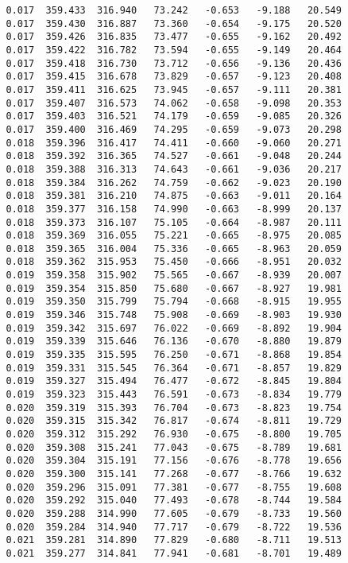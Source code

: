 \begin{verbatim}
   0.017  359.433  316.940   73.242   -0.653   -9.188   20.549
   0.017  359.430  316.887   73.360   -0.654   -9.175   20.520
   0.017  359.426  316.835   73.477   -0.655   -9.162   20.492
   0.017  359.422  316.782   73.594   -0.655   -9.149   20.464
   0.017  359.418  316.730   73.712   -0.656   -9.136   20.436
   0.017  359.415  316.678   73.829   -0.657   -9.123   20.408
   0.017  359.411  316.625   73.945   -0.657   -9.111   20.381
   0.017  359.407  316.573   74.062   -0.658   -9.098   20.353
   0.017  359.403  316.521   74.179   -0.659   -9.085   20.326
   0.017  359.400  316.469   74.295   -0.659   -9.073   20.298
   0.018  359.396  316.417   74.411   -0.660   -9.060   20.271
   0.018  359.392  316.365   74.527   -0.661   -9.048   20.244
   0.018  359.388  316.313   74.643   -0.661   -9.036   20.217
   0.018  359.384  316.262   74.759   -0.662   -9.023   20.190
   0.018  359.381  316.210   74.875   -0.663   -9.011   20.164
   0.018  359.377  316.158   74.990   -0.663   -8.999   20.137
   0.018  359.373  316.107   75.105   -0.664   -8.987   20.111
   0.018  359.369  316.055   75.221   -0.665   -8.975   20.085
   0.018  359.365  316.004   75.336   -0.665   -8.963   20.059
   0.018  359.362  315.953   75.450   -0.666   -8.951   20.032
   0.019  359.358  315.902   75.565   -0.667   -8.939   20.007
   0.019  359.354  315.850   75.680   -0.667   -8.927   19.981
   0.019  359.350  315.799   75.794   -0.668   -8.915   19.955
   0.019  359.346  315.748   75.908   -0.669   -8.903   19.930
   0.019  359.342  315.697   76.022   -0.669   -8.892   19.904
   0.019  359.339  315.646   76.136   -0.670   -8.880   19.879
   0.019  359.335  315.595   76.250   -0.671   -8.868   19.854
   0.019  359.331  315.545   76.364   -0.671   -8.857   19.829
   0.019  359.327  315.494   76.477   -0.672   -8.845   19.804
   0.019  359.323  315.443   76.591   -0.673   -8.834   19.779
   0.020  359.319  315.393   76.704   -0.673   -8.823   19.754
   0.020  359.315  315.342   76.817   -0.674   -8.811   19.729
   0.020  359.312  315.292   76.930   -0.675   -8.800   19.705
   0.020  359.308  315.241   77.043   -0.675   -8.789   19.681
   0.020  359.304  315.191   77.156   -0.676   -8.778   19.656
   0.020  359.300  315.141   77.268   -0.677   -8.766   19.632
   0.020  359.296  315.091   77.381   -0.677   -8.755   19.608
   0.020  359.292  315.040   77.493   -0.678   -8.744   19.584
   0.020  359.288  314.990   77.605   -0.679   -8.733   19.560
   0.020  359.284  314.940   77.717   -0.679   -8.722   19.536
   0.021  359.281  314.890   77.829   -0.680   -8.711   19.513
   0.021  359.277  314.841   77.941   -0.681   -8.701   19.489

\end{verbatim}
